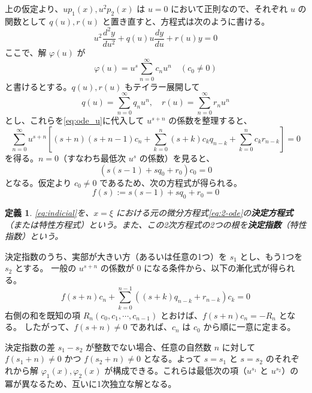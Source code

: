 \documentclass[paper=a4, fontsize=11pt]{jlreq} %
\theoremstyle{break}
\newtheorem{definition}[theorem]{定義}
\theoremstyle{qa}
\theoremstyle{remark} %
\begin{document}
上の仮定より、$u p_{1}(x), u^{2} p_{2}(x)$ は $u=0$ において正則なので、それぞれ $u$ の関数として $q(u), r(u)$ と置き直すと、方程式は次のように書ける。
\begin{equation}\label{eq:ode_u}
u^{2}\frac{d^{2}y}{du^{2}} + q(u) u\frac{dy}{du} + r(u) y = 0
\end{equation}
ここで、解 $\varphi(u)$ が
\[
\varphi(u) = u^{s}\sum_{n=0}^{\infty}c_{n}u^{n} \quad (c_{0}\neq 0)
\]
と書けるとする。$q(u), r(u)$ もテイラー展開して
\[
q(u) = \sum_{n=0}^{\infty}q_{n}u^{n}, \quad r(u) = \sum_{n=0}^{\infty}r_{n}u^{n}
\]
とし、これらを\eqref{eq:ode_u}に代入して $u^{s+n}$ の係数を整理すると、
\[
\sum_{n=0}^{\infty} u^{s+n} \left[ (s+n)(s+n-1)c_{n} + \sum_{k=0}^{n} (s+k)c_{k}q_{n-k} + \sum_{k=0}^{n} c_{k}r_{n-k} \right] = 0
\]
を得る。$n=0$（すなわち最低次 $u^s$ の係数）を見ると、
\[
(s(s-1) + sq_{0} + r_{0})c_{0} = 0
\]
となる。仮定より $c_{0} \neq 0$ であるため、次の方程式が得られる。
\begin{equation}\label{eq:indicial}
f(s) := s(s-1) + sq_{0} + r_{0} = 0
\end{equation}

\begin{definition}
\eqref{eq:indicial}を、$x=\xi$ における元の微分方程式\eqref{eq:2-ode}の\textbf{決定方程式}（または特性方程式）という。また、この2次方程式の2つの根を\textbf{決定指数}（特性指数）という。
\end{definition}

決定指数のうち、実部が大きい方（あるいは任意の1つ）を $s_{1}$ とし、もう1つを $s_{2}$ とする。
一般の $u^{s+n}$ の係数が $0$ になる条件から、以下の漸化式が得られる。
\begin{equation}\label{eq:recurrence}
f(s+n)c_{n} + \sum_{k=0}^{n-1} \left( (s+k)q_{n-k} + r_{n-k} \right) c_{k} = 0
\end{equation}
右側の和を既知の項 $R_n(c_{0}, c_{1}, \cdots, c_{n-1})$ とおけば、$f(s+n)c_{n} = -R_n$ となる。
したがって、$f(s+n) \neq 0$ であれば、$c_{n}$ は $c_{0}$ から順に一意に定まる。

決定指数の差 $s_{1} - s_{2}$ が整数でない場合、任意の自然数 $n$ に対して $f(s_{1}+n) \neq 0$ かつ $f(s_{2}+n) \neq 0$ となる。よって $s=s_{1}$ と $s=s_{2}$ のそれぞれから解 $\varphi_{1}(x), \varphi_{2}(x)$ が構成できる。これらは最低次の項（$u^{s_1}$ と $u^{s_2}$）の冪が異なるため、互いに1次独立な解となる。
\end{document}
